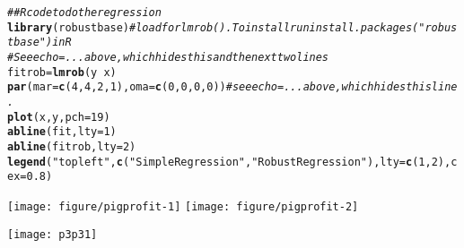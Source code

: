 \documentclass[11pt]{article}\usepackage[]{graphicx}\usepackage[]{color}
\makeatletter
\newcommand{\hlnum}[1]{\textcolor[rgb]{0.686,0.059,0.569}{#1}}%
\newcommand{\hlstr}[1]{\textcolor[rgb]{0.192,0.494,0.8}{#1}}%
\newcommand{\hlcom}[1]{\textcolor[rgb]{0.678,0.584,0.686}{\textit{#1}}}%
\newcommand{\hlopt}[1]{\textcolor[rgb]{0,0,0}{#1}}%
\newcommand{\hlstd}[1]{\textcolor[rgb]{0.345,0.345,0.345}{#1}}%
\newcommand{\hlkwb}[1]{\textcolor[rgb]{0.69,0.353,0.396}{#1}}%
\newcommand{\hlkwc}[1]{\textcolor[rgb]{0.333,0.667,0.333}{#1}}%
\newcommand{\hlkwd}[1]{\textcolor[rgb]{0.737,0.353,0.396}{\textbf{#1}}}%
\newenvironment{kframe}{%
 \def\at@end@of@kframe{}%
 \ifinner\ifhmode%
  \def\at@end@of@kframe{\end{minipage}}%
  \begin{minipage}{\columnwidth}%
 \fi\fi%
 \def\FrameCommand##1{\hskip\@totalleftmargin \hskip-\fboxsep
 \colorbox{shadecolor}{##1}\hskip-\fboxsep
     \hskip-\linewidth \hskip-\@totalleftmargin \hskip\columnwidth}%
 \MakeFramed {\advance\hsize-\width
   \@totalleftmargin\z@ \linewidth\hsize
   \@setminipage}}%
 {\par\unskip\endMakeFramed%
 \at@end@of@kframe}
\newenvironment{knitrout}{}{} %
\makeatother
\begin{document}
\begin{knitrout}\footnotesize
{}\color{fgcolor}\begin{kframe}
\begin{alltt}
\hlcom{## R code to do the regression}
\hlkwd{library}\hlstd{(robustbase)} \hlcom{# load for lmrob(). To install run install.packages("robustbase") in R}
\hlcom{# See echo=... above, which hides this and the next two lines}
\hlstd{fitrob}\hlkwb{=}\hlkwd{lmrob}\hlstd{(y}\hlopt{~}\hlstd{x)}
\hlkwd{par}\hlstd{(}\hlkwc{mar}\hlstd{=}\hlkwd{c}\hlstd{(}\hlnum{4}\hlstd{,}\hlnum{4}\hlstd{,}\hlnum{2}\hlstd{,}\hlnum{1}\hlstd{),} \hlkwc{oma}\hlstd{=}\hlkwd{c}\hlstd{(}\hlnum{0}\hlstd{,}\hlnum{0}\hlstd{,}\hlnum{0}\hlstd{,}\hlnum{0}\hlstd{))} \hlcom{# see echo=... above, which hides this line.}
\hlkwd{plot}\hlstd{(x,y,}\hlkwc{pch}\hlstd{=}\hlnum{19}\hlstd{)}
\hlkwd{abline}\hlstd{(fit,}\hlkwc{lty}\hlstd{=}\hlnum{1}\hlstd{)}
\hlkwd{abline}\hlstd{(fitrob,}\hlkwc{lty}\hlstd{=}\hlnum{2}\hlstd{)}
\hlkwd{legend}\hlstd{(}\hlstr{"topleft"}\hlstd{,}\hlkwd{c}\hlstd{(}\hlstr{"Simple Regression"}\hlstd{,}\hlstr{"Robust Regression"}\hlstd{),} \hlkwc{lty}\hlstd{=}\hlkwd{c}\hlstd{(}\hlnum{1}\hlstd{,}\hlnum{2}\hlstd{),} \hlkwc{cex}\hlstd{=}\hlnum{0.8}\hlstd{)}
\end{alltt}
\end{kframe}
\texttt{[image: figure/pigprofit-1]} 
\texttt{[image: figure/pigprofit-2]} 

\end{knitrout}

\begin{center}
\texttt{[image: p3p31]}
\end{center}
\end{document}

